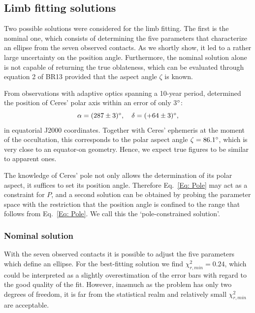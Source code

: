 \documentclass[useAMS,usenatbib]{mn2e}
\begin{document}
\subsection{Limb fitting solutions}\label{Sec: limbfitting-2010}

Two possible solutions were considered for the limb fitting. The first is the nominal one, which consists of determining the five parameters that characterize an ellipse from the seven observed contacts. As we shortly show, it led to a rather large uncertainty on the position angle. Furthermore, the nominal solution alone is not capable of returning the true oblateness, which can be evaluated through equation 2 of BR13  provided that the aspect angle $\zeta$ is known.%

From observations with adaptive optics spanning a 10-year period, \cite{Drummond2014} determined the position of Ceres' polar axis within an error of only 3$\hbox{$^\circ$}$:
\begin{equation}
\alpha = (287 \pm 3) \degr, \quad %
\delta = (+64 \pm 3) \degr,
\label{Eq: Pole}
\end{equation}
%
in equatorial J2000 coordinates. Together with Ceres' ephemeris at the moment of the occultation, this corresponds to the polar aspect angle $\zeta = 86.1\hbox{$^\circ$}$, which is very close to an equator-on geometry. Hence, we expect true figures to be similar to apparent ones.

The knowledge of Ceres' pole not only allows the determination of its polar aspect, it suffices to set its position angle. Therefore Eq.~\ref{Eq: Pole} may act as a constraint for $P$, and a second solution can be obtained by probing the parameter space with the restriction that the position angle is confined to the range that follows from Eq.~\ref{Eq: Pole}. We call this the `pole-constrained solution'.


\subsubsection{Nominal solution}

With the seven observed contacts it is possible to adjust the five parameters which define an ellipse. For the best-fitting solution we find $\chi^2_{r,min} = 0.24$, which could be interpreted as a slightly overestimation of the error bars with regard to the good quality of the fit. However, inasmuch as the problem has only two degrees of freedom, it is far from the statistical realm and relatively small $\chi^2_{r,min}$ are acceptable.
\end{document}
